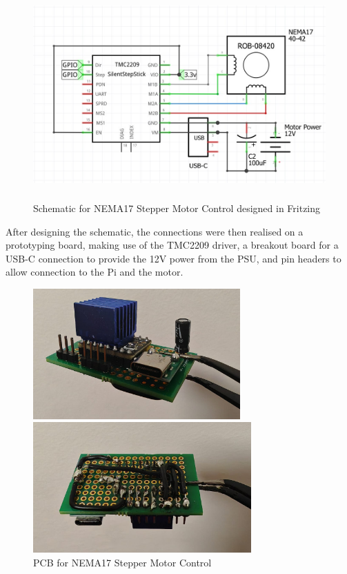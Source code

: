 \begin{figure}[H]
    \hfill
    \begin{minipage}[t]{\textwidth}
      \centering
      \includegraphics[width=\textwidth,height=8cm, keepaspectratio]{imgs/diagrams/tmc2209wiring.jpg}
      \caption{Schematic for NEMA17 Stepper Motor Control designed in Fritzing \cite{fritzing}}
    \end{minipage}
\end{figure}

After designing the schematic, the connections were then realised on a prototyping board, making use of the TMC2209 driver, a breakout board for a USB-C connection to provide the 12V power from the PSU, and pin headers to allow connection to the Pi and the motor.

\begin{figure}[H]
    \hfill
    \begin{minipage}[t]{0.45\textwidth}
      \centering
      \includegraphics[width=\textwidth,height=5cm, keepaspectratio]{imgs/real/tmc2209-0.jpeg}
    \end{minipage}
    \hfill
    \begin{minipage}[t]{0.45\textwidth}
      \centering
      \includegraphics[width=\textwidth,height=5cm, keepaspectratio]{imgs/real/tmc2209-1.jpeg}
    \end{minipage}
    \hfill
    \caption{PCB for NEMA17 Stepper Motor Control}
    \label{fig:tmc2209-pcb}
\end{figure}

